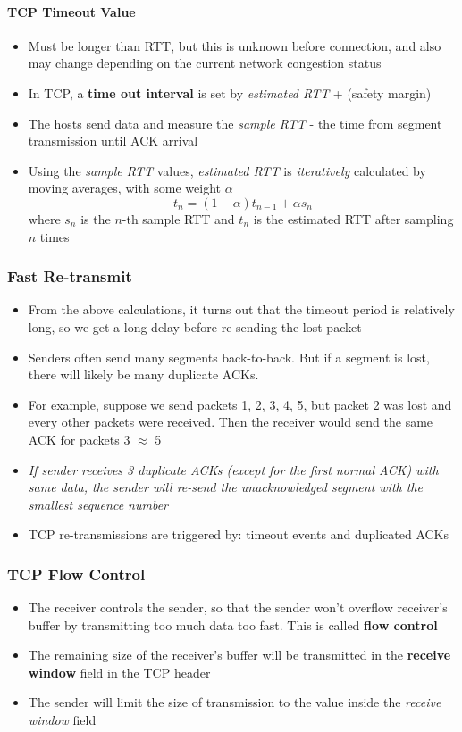 \paragraph{TCP Timeout Value}
\begin{itemize}
	\item Must be longer than RTT, but this is unknown before connection, and also may change depending on the current network congestion status
	\item In TCP, a \textbf{time out interval} is set by  \textit{estimated RTT} + (safety margin)
	\item The hosts send data and measure the \textit{sample RTT} - the time from segment transmission until ACK arrival
	\item Using the \textit{sample RTT} values, \textit{estimated RTT} is \textit{iteratively} calculated by moving averages, with some weight $\alpha$
	$$t_{n} = (1-\alpha) t_{n-1} + \alpha s_n $$
	where $s_n$ is the $n$-th sample RTT and $t_n$ is the estimated RTT after sampling $n$ times
\end{itemize}

\subsubsection{Fast Re-transmit}
\begin{itemize}
	\item From the above calculations, it turns out that the timeout period is relatively long, so we get a long delay before re-sending the lost packet
	\item Senders often send many segments back-to-back. But if a segment is lost, there will likely be many duplicate ACKs.
	\item For example, suppose we send packets 1, 2, 3, 4, 5, but packet 2 was lost and every other packets were received. Then the receiver would send the same ACK for packets 3 $\approx$ 5
	\item \textit{If sender receives 3 duplicate ACKs (except for the first normal ACK) with same data, the sender will re-send the unacknowledged segment with the smallest sequence number}
	\item TCP re-transmissions are triggered by: timeout events and duplicated ACKs 
\end{itemize}

\subsubsection{TCP Flow Control}
\begin{itemize}
	\item The receiver controls the sender, so that the sender won't overflow receiver's buffer by transmitting too much data too fast. This is called \textbf{flow control}
	\item The remaining size of the receiver's buffer will be transmitted in the \textbf{receive window} field in the TCP header
	\item The sender will limit the size of transmission to the value inside the \textit{receive window} field
\end{itemize}

